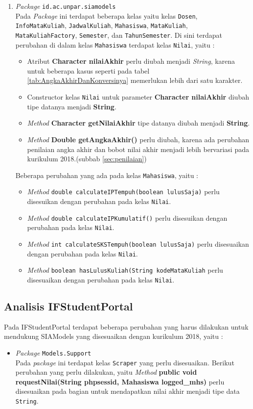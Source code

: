 \begin{enumerate}
	\item \textit{Package} \texttt{id.ac.unpar.siamodels}\\
	Pada \textit{Package} ini terdapat beberapa kelas yaitu kelas \texttt{Dosen}, \texttt{InfoMataKuliah}, \texttt{JadwalKuliah}, \texttt{Mahasiswa}, \texttt{MataKuliah}, \texttt{MataKuliahFactory}, \texttt{Semester}, dan \texttt{TahunSemester}. Di sini terdapat perubahan di dalam kelas \texttt{Mahasiswa} terdapat kelas \texttt{Nilai}, yaitu :
	\begin{itemize}
		\item Atribut \textbf{Character nilaiAkhir} perlu diubah menjadi \textit{String}, karena untuk beberapa kasus seperti pada tabel \ref{tab:AngkaAkhirDanKonversinya} memerlukan lebih dari satu karakter.
		\item Constructor kelas \texttt{Nilai} untuk parameter \textbf{Character nilaiAkhir} diubah tipe datanya menjadi \textbf{String}.
		\item \textit{Method} \textbf{Character getNilaiAkhir} tipe datanya diubah menjadi \textbf{String}.
		\item \textit{Method} \textbf{Double getAngkaAkhir()} perlu diubah, karena ada perubahan penilaian angka akhir dan bobot nilai akhir menjadi lebih bervariasi pada kurikulum 2018.(subbab \ref{sec:penilaian}) 
	\end{itemize}
	Beberapa perubahan yang ada pada kelas \texttt{Mahasiswa}, yaitu :
	\begin{itemize}
		\item \textit{Method} \texttt{double calculateIPTempuh(boolean lulusSaja)} perlu disesuikan dengan perubahan pada kelas \texttt{Nilai}.
		\item \textit{Method} \texttt{double calculateIPKumulatif()} perlu disesuikan dengan perubahan pada kelas \texttt{Nilai}.
		\item \textit{Method} \texttt{int calculateSKSTempuh(boolean lulusSaja)} perlu disesuaikan dengan perubahan pada kelas \texttt{Nilai}.
		\item \textit{Method} \texttt{boolean hasLulusKuliah(String kodeMataKuliah} perlu disesuaikan dengan perubahan pada kelas \texttt{Nilai}.
	\end{itemize}
\end{enumerate}

\subsection{Analisis IFStudentPortal}
\label{subbab:analisisifstudentportal}

Pada IFStudentPortal terdapat beberapa perubahan yang harus dilakukan untuk mendukung SIAModels yang disesuaikan dengan kurikulum 2018, yaitu :
\begin{itemize}
	\item \textit{Package} \texttt{Models.Support} \\
	Pada \textit{package} ini terdapat kelas \texttt{Scraper} yang perlu disesuaikan. Berikut perubahan yang perlu dilakukan, yaitu \textit{Method} \textbf{public void requestNilai(String phpsessid, Mahasiswa logged\_mhs)} perlu disesuaikan pada bagian untuk mendapatkan nilai akhir menjadi tipe data \texttt{String}.
\end{itemize}
